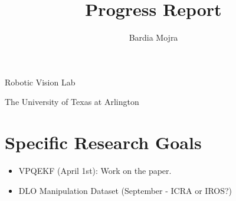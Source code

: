 \documentclass[11pt]{article}
\title{Progress Report}
\author{Bardia Mojra}
\begin{document}
\maketitle
\thispagestyle{empty}

\bigskip
\bigskip
\begin{center}
      Robotic Vision Lab
\end{center}

\begin{center}
      The University of Texas at Arlington
\end{center}

\newpage

\section{Specific Research Goals}
\begin{itemize}
      \item VPQEKF (April 1st): Work on the paper.
      \item DLO Manipulation Dataset (September - ICRA or IROS?)
\end{itemize}
\end{document}

